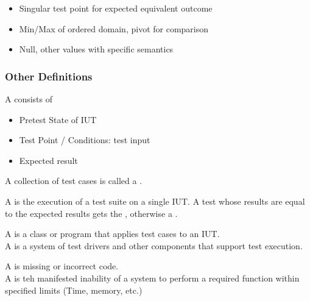 \documentclass[
    ../../Software_Engineering_Summary.tex,
]
{subfiles}
\begin{document}
\begin{defbox}
    \begin{itemize}
        \item {} Singular test point for expected equivalent outcome
        \item {} Min/Max of ordered domain, pivot for comparison
        \item {} Null, other values with specific semantics
    \end{itemize}    
\end{defbox}

\subsubsection{Other Definitions}
\begin{defbox}
    A  consists of
    \begin{itemize}
        \item Pretest State of IUT
        \item Test Point / Conditions: test input
        \item Expected result
    \end{itemize}
    A collection of test cases is called a .
\end{defbox}

\begin{defbox}
    A  is the execution of a test suite on a single IUT.
    A test whose results are equal to the expected results gets the  , otherwise a .
\end{defbox}

\begin{defbox}
    A  is a class or program that applies test cases to an IUT.\\
    A  is a system of test drivers and other components that support test execution.
\end{defbox}

\begin{defbox}
    A  is missing or incorrect code.\\
    A  is teh manifested inability of a system to perform a required function within specified limits (Time, memory, etc.)
\end{defbox}
\end{document}
